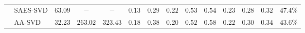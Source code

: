 \documentclass[10pt]{article} %
\theoremstyle{definition}
\theoremstyle{remark}
\newcommand{\ourmethodlight}{{\textsc{AA-SVD}}}
\begin{document}
\begin{table}[t]
{\begin{tabular}{c l ccc !{\hspace{3pt}\vline\hspace{3pt}} ccccccccc}
& SAES-SVD & $63.09$ & $-$ & $-$ & $0.13$ & $0.29$ & $\mathbf{0.22}$ & $0.53$ & $0.54$ & $0.23$ & $0.28$ & $0.32$ & $47.4\%$ \\
  & \ourmethodlight~& $\mathbf{32.23}$ & $\mathbf{263.02}$ & $\mathbf{323.43}$ & $\mathbf{0.18}$ & $\mathbf{0.38}$ & ${0.20}$ & $\mathbf{0.52}$ & $\mathbf{0.58}$ & $\mathbf{0.22}$ & $\mathbf{0.30}$ & $\mathbf{0.34}$ & $\mathbf{  43.6\%}$ \\
\bottomrule
\end{tabular}
}
\end{table}
\end{document}
